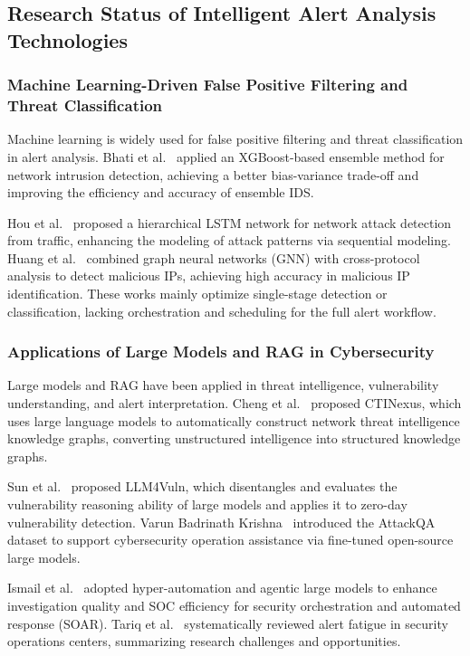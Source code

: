 \documentclass[sigconf,authordraft]{acmart}
\begin{document}
\subsection{Research Status of Intelligent Alert Analysis Technologies}

\subsubsection{Machine Learning-Driven False Positive Filtering and Threat Classification}

Machine learning is widely used for false positive filtering and threat classification in alert analysis. Bhati et al.~\cite{ref11} applied an XGBoost-based ensemble method for network intrusion detection, achieving a better bias-variance trade-off and improving the efficiency and accuracy of ensemble IDS.

Hou et al.~\cite{ref12} proposed a hierarchical LSTM network for network attack detection from traffic, enhancing the modeling of attack patterns via sequential modeling. Huang et al.~\cite{ref13} combined graph neural networks (GNN) with cross-protocol analysis to detect malicious IPs, achieving high accuracy in malicious IP identification. These works mainly optimize single-stage detection or classification, lacking orchestration and scheduling for the full alert workflow.

\subsubsection{Applications of Large Models and RAG in Cybersecurity}

Large models and RAG have been applied in threat intelligence, vulnerability understanding, and alert interpretation. Cheng et al.~\cite{ref14} proposed CTINexus, which uses large language models to automatically construct network threat intelligence knowledge graphs, converting unstructured intelligence into structured knowledge graphs.

Sun et al.~\cite{ref15} proposed LLM4Vuln, which disentangles and evaluates the vulnerability reasoning ability of large models and applies it to zero-day vulnerability detection. Varun Badrinath Krishna~\cite{ref16} introduced the AttackQA dataset to support cybersecurity operation assistance via fine-tuned open-source large models.

Ismail et al.~\cite{ref17} adopted hyper-automation and agentic large models to enhance investigation quality and SOC efficiency for security orchestration and automated response (SOAR). Tariq et al.~\cite{ref18} systematically reviewed alert fatigue in security operations centers, summarizing research challenges and opportunities.
\end{document}
